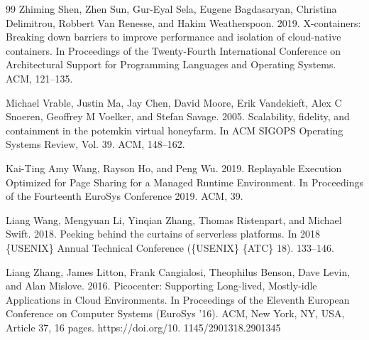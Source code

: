 \begin{thebibliography}{99}
 Zhiming Shen, Zhen Sun, Gur-Eyal Sela, Eugene Bagdasaryan, Christina Delimitrou, Robbert Van Renesse, and Hakim Weatherspoon. 2019. X-containers: Breaking down barriers to improve performance and isolation of cloud-native containers. In Proceedings of the Twenty-Fourth International Conference on Architectural Support for Programming Languages and Operating Systems. ACM, 121--135.

 Michael Vrable, Justin Ma, Jay Chen, David Moore, Erik Vandekieft, Alex C Snoeren, Geoffrey M Voelker, and Stefan Savage. 2005. Scalability, fidelity, and containment in the potemkin virtual honeyfarm. In ACM SIGOPS Operating Systems Review, Vol. 39. ACM, 148--162.

 Kai-Ting Amy Wang, Rayson Ho, and Peng Wu. 2019. Replayable Execution Optimized for Page Sharing for a Managed Runtime Environment. In Proceedings of the Fourteenth EuroSys Conference 2019. ACM, 39.

 Liang Wang, Mengyuan Li, Yinqian Zhang, Thomas Ristenpart, and Michael Swift. 2018. Peeking behind the curtains of serverless platforms. In 2018 \{USENIX\} Annual Technical Conference (\{USENIX\} \{ATC\} 18). 133--146.

 Liang Zhang, James Litton, Frank Cangialosi, Theophilus Benson, Dave Levin, and Alan Mislove. 2016. Picocenter: Supporting Long-lived, Mostly-idle Applications in Cloud Environments. In Proceedings of the Eleventh European Conference on Computer Systems (EuroSys '16). ACM, New York, NY, USA, Article 37, 16 pages. https://doi.org/10. 1145/2901318.2901345

\end{thebibliography}